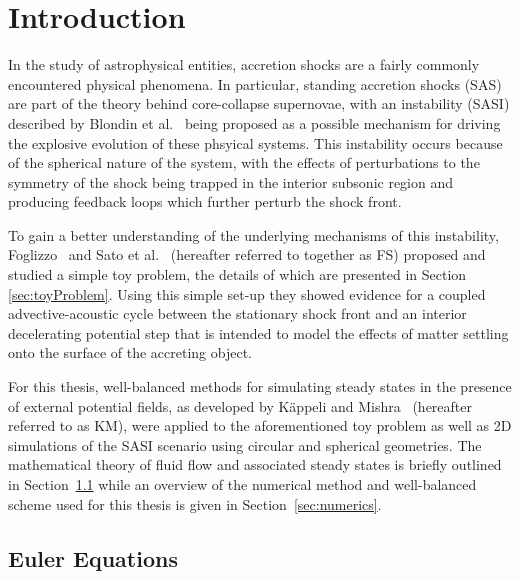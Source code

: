 \newcommand{\package}{\emph}

\chapter{Introduction}

In the study of astrophysical entities, accretion shocks are a fairly commonly encountered physical phenomena. In particular, standing accretion shocks (SAS) are part of the theory behind core-collapse supernovae, with an instability (SASI) described by Blondin et al.~\cite{Blondin2003} being proposed as a possible mechanism for driving the explosive evolution of these phsyical systems. This instability occurs because of the spherical nature of the system, with the effects of perturbations to the symmetry of the shock being trapped in the interior subsonic region and producing feedback loops which further perturb the shock front.

To gain a better understanding of the underlying mechanisms of this instability, Foglizzo~\cite{Foglizzo2009} and Sato et al.~\cite{Sato2009} (hereafter referred to together as FS) proposed and studied a simple toy problem, the details of which are presented in Section \ref{sec:toyProblem}. Using this simple set-up they showed evidence for a coupled advective-acoustic cycle between the stationary shock front and an interior decelerating potential step that is intended to model the effects of matter settling onto the surface of the accreting object.

For this thesis, well-balanced methods for simulating steady states in the presence of external potential fields, as developed by K\"appeli and Mishra~\cite{Kappeli2014} (hereafter referred to as KM), were applied to the aforementioned toy problem as well as 2D simulations of the SASI scenario using circular and spherical geometries. The mathematical theory of fluid flow and associated steady states is briefly outlined in Section~\ref{sec:euler} while an overview of the numerical method and well-balanced scheme used for this thesis is given in Section~\ref{sec:numerics}.


\section{Euler Equations}
\label{sec:euler}

